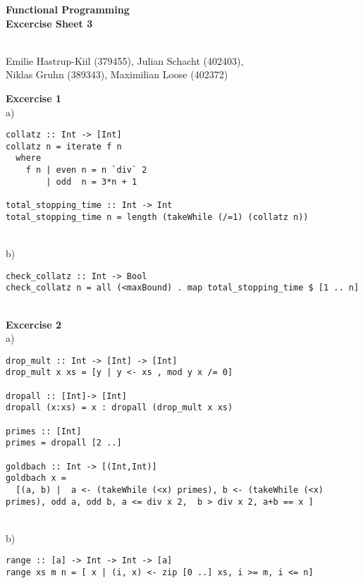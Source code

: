 \documentclass[a4paper,12pt,oneside]{book}
\begin{document}
\setlength{\parindent}{0em}


\begin{center}
\textbf{\huge{Functional Programming} \\ \large{ Excercise Sheet 3}} %

~\\
Emilie Hastrup-Kiil (379455),
Julian Schacht (402403), \\
Niklas Gruhn (389343),
Maximilian Loose (402372)
\end{center}
\textbf{Excercise 1} \\ %
a)
\begin{lstlisting}
collatz :: Int -> [Int]
collatz n = iterate f n
  where
    f n | even n = n `div` 2
        | odd  n = 3*n + 1

total_stopping_time :: Int -> Int
total_stopping_time n = length (takeWhile (/=1) (collatz n))
\end{lstlisting}
~\\
b)
\begin{lstlisting}
check_collatz :: Int -> Bool
check_collatz n = all (<maxBound) . map total_stopping_time $ [1 .. n]
\end{lstlisting}
~\\
\textbf{Excercise 2} \\%
a)
\begin{lstlisting}
drop_mult :: Int -> [Int] -> [Int]
drop_mult x xs = [y | y <- xs , mod y x /= 0]

dropall :: [Int]-> [Int]
dropall (x:xs) = x : dropall (drop_mult x xs)

primes :: [Int]
primes = dropall [2 ..]

goldbach :: Int -> [(Int,Int)]
goldbach x =
  [(a, b) |  a <- (takeWhile (<x) primes), b <- (takeWhile (<x) primes), odd a, odd b, a <= div x 2,  b > div x 2, a+b == x ]
\end{lstlisting}
~\\
b)
\begin{lstlisting}
range :: [a] -> Int -> Int -> [a]
range xs m n = [ x | (i, x) <- zip [0 ..] xs, i >= m, i <= n]
\end{lstlisting}
~\\
\end{document}
